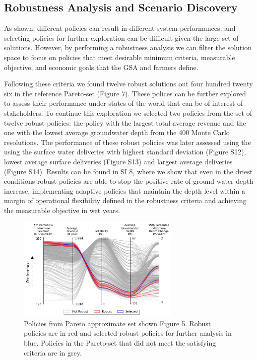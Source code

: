 \documentclass[a4paper,fleqn]{cas-sc}
\begin{document}
\subsection{Robustness Analysis and Scenario Discovery}

As shown, different policies can result in different system performances, and selecting policies for further exploration can be difficult given the large set of solutions. However, by performing a robustness analysis we can filter the solution space to focus on policies that meet desirable minimum criteria, measurable objective, and economic goals that the GSA and farmers define. 

Following these criteria we found twelve robust solutions out four hundred twenty six in the reference Pareto-set (Figure 7). These polices can be further explored to assess their performance under states of the world that can be of interest of stakeholders. To continue this exploration we selected two policies from the set of twelve robust policies: the policy with the largest total average revenue and the one with the lowest average groundwater depth from the 400 Monte Carlo resolutions. The performance of these robust policies was later assessed using the using the surface water deliveries with highest standard deviation (Figure S12), lowest average surface deliveries (Figure S13) and largest average deliveries (Figure S14). Results can be found in SI 8, where we show that even in the driest conditions robust policies are able to stop the positive rate of ground water depth increase, implementing adaptive policies that maintain the depth level within a margin of operational flexibility defined in the robustness criteria and achieving the measurable objective in wet years. 

\begin{figure}[H]
    \centering
    \includegraphics[width=0.7\textwidth]{robust_policies_parallel_axis.png}
    \caption{Policies from Pareto approximate set shown Figure 5. Robust policies are in red and selected robust policies for further analysis in blue. Policies in the Pareto-set that did not meet the satisfying criteria are in grey.} \label{fig:parallel_robustness}
\end{figure}
\end{document}

